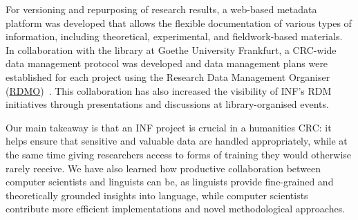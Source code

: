 \documentclass{eceasst}
\begin{document}
For versioning and repurposing of research results, a web-based metadata platform was developed that allows the flexible documentation of various types of information, including theoretical, experimental, and fieldwork-based materials.
In collaboration with the library at Goethe University Frankfurt, a CRC-wide data management protocol was developed and data management plans were established for each project using the Research Data Management Organiser (\href{https://rdmo.uni-frankfurt.de/}{RDMO})~\cite{Bahmanian:et:al:2025}.
This collaboration has also increased the visibility of INF’s RDM initiatives through presentations and discussions at library-organised events.

Our main takeaway is that an INF project is crucial in a humanities CRC: it helps ensure that sensitive and valuable data are handled appropriately, while at the same time giving researchers access to forms of training they would otherwise rarely receive. 
We have also learned how productive collaboration between computer scientists and linguists can be, as linguists provide fine-grained and theoretically grounded insights into language, while computer scientists contribute more efficient implementations and novel methodological approaches.
\end{document}
